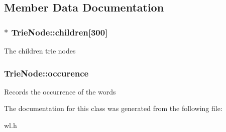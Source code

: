 \subsection{Member Data Documentation}
\hypertarget{classTrieNode_a7ab2ae8c9766291e26f7a3270ed03f05}{
\subsubsection[{children}]{$\ast$ Trie\-Node\-::children\mbox{[}300\mbox{]}}}\label{classTrieNode_a7ab2ae8c9766291e26f7a3270ed03f05}
The children trie nodes \hypertarget{classTrieNode_a40d27fb23ecec3ac979511b90c15cb4a}{
\subsubsection[{occurence}]{ Trie\-Node\-::occurence}}\label{classTrieNode_a40d27fb23ecec3ac979511b90c15cb4a}
Records the occurrence of the words 

The documentation for this class was generated from the following file\-:\begin{DoxyCompactItemize}
\item 
wl.\-h\end{DoxyCompactItemize}
